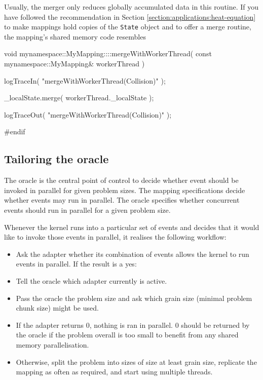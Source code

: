 Usually, the merger only reduces globally accumulated data in this routine. 
If you have followed the recommendation in Section
\ref{section:applications:heat-equation} to make mappings hold copies of the
\texttt{State} object and to offer a merge routine, the mapping's shared
memory code resembles

\begin{code}
void mynamespace::MyMapping::::mergeWithWorkerThread(
  const mynamespace::MyMapping& workerThread
) {
  logTraceIn( "mergeWithWorkerThread(Collision)" );

  _localState.merge( workerThread._localState );
  
  logTraceOut( "mergeWithWorkerThread(Collision)" );
}
#endif

\end{code}



\subsection{Tailoring the oracle}

The oracle is the central point of control to decide whether event should be
invoked in parallel for given problem sizes.
The mapping specifications decide whether events may run in parallel.
The oracle specifies whether concurrent events should run in parallel for a
given problem size.


Whenever the kernel runs into a particular set of events and decides that it
would like to invoke those events in parallel, it realises the following
workflow:
\begin{itemize}
  \item Ask the adapter whether its combination of events allows the kernel to
  run events in parallel. If the result is a yes:
  \item Tell the oracle which adapter currently is active.
  \item Pass the oracle the problem size and ask which grain size (minimal
  problem chunk size) might be used. 
  \item If the adapter returns 0, nothing is ran in parallel. 0 should be
  returned by the oracle if the problem overall is too small to benefit from any
  shared memory parallelisation.
  \item Otherwise, split the problem into sizes of size at least grain size,
  replicate the mapping as often as required, and start using multiple threads.
\end{itemize}

